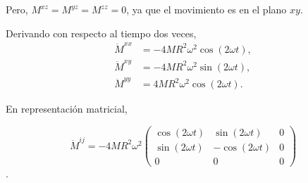 \documentclass[letterpaper,11pt]{article}
\begin{document}
Pero, $M^{xz} = M^{yz} = M^{zz} = 0$, ya que el movimiento es en el plano $xy$.

Derivando con respecto al tiempo dos veces,
\begin{align}
\ddot{M}^{xx} &= - 4 MR^2 \omega^2\cos(2\omega t), \\
\ddot{M}^{xy} &= - 4 MR^2 \omega^2\sin(2\omega t), \\
\ddot{M}^{yy} &=  4 MR^2 \omega^2\cos(2\omega t).
\end{align}

En representación matricial, 
\begin{shaded}
\begin{equation}
\ddot{M}^{ij} = -4MR^2\omega^2 \begin{pmatrix}
\cos(2\omega t) & \sin(2\omega t) & 0 \\
\sin(2\omega t) & -\cos(2\omega t) & 0 \\
0 & 0 & 0
\end{pmatrix}
\end{equation}.
\end{shaded}
\end{document}
